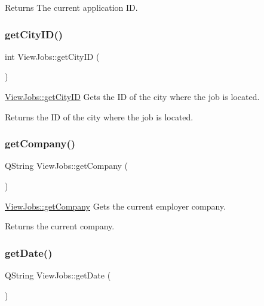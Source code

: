 \begin{DoxyReturn}{Returns}
The current application ID. 
\end{DoxyReturn}
\mbox{\label{class_view_jobs_adcafeca350b21a033aa630e042ee7947}} 
\subsubsection{\texorpdfstring{get\+City\+I\+D()}{getCityID()}}
{\footnotesize\ttfamily int View\+Jobs\+::get\+City\+ID (\begin{DoxyParamCaption}{ }\end{DoxyParamCaption})}



\hyperlink{class_view_jobs_adcafeca350b21a033aa630e042ee7947}{View\+Jobs\+::get\+City\+ID} Gets the ID of the city where the job is located. 

\begin{DoxyReturn}{Returns}
the ID of the city where the job is located. 
\end{DoxyReturn}
\mbox{\label{class_view_jobs_a88d7c0a7a79bc7a7e02b524587983bf8}} 
\subsubsection{\texorpdfstring{get\+Company()}{getCompany()}}
{\footnotesize\ttfamily Q\+String View\+Jobs\+::get\+Company (\begin{DoxyParamCaption}{ }\end{DoxyParamCaption})}



\hyperlink{class_view_jobs_a88d7c0a7a79bc7a7e02b524587983bf8}{View\+Jobs\+::get\+Company} Gets the current employer company. 

\begin{DoxyReturn}{Returns}
the current company. 
\end{DoxyReturn}
\mbox{\label{class_view_jobs_af046f9201cc6031e070b4f9b613a35f9}} 
\subsubsection{\texorpdfstring{get\+Date()}{getDate()}}
{\footnotesize\ttfamily Q\+String View\+Jobs\+::get\+Date (\begin{DoxyParamCaption}{ }\end{DoxyParamCaption})}



